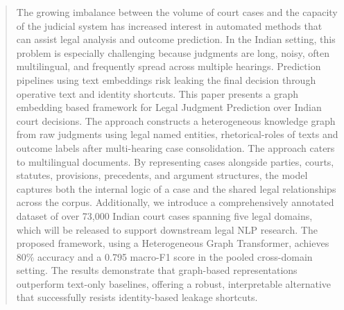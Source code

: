 \begin{abstract}
The growing imbalance between the volume of court cases and the capacity of the judicial system has increased interest in automated methods that can assist legal analysis and outcome prediction. In the Indian setting, this problem is especially challenging because judgments are long, noisy, often multilingual, and frequently spread across multiple hearings.  Prediction pipelines using text embeddings risk leaking the final decision through operative text and identity shortcuts. This paper presents a graph embedding based framework for Legal Judgment Prediction over Indian court decisions. The approach constructs a heterogeneous knowledge graph from raw judgments using legal named entities, rhetorical-roles of texts and outcome labels after multi-hearing case consolidation. The approach caters to multilingual documents. By representing cases alongside parties, courts, statutes, provisions, precedents, and argument structures, the model captures both the internal logic of a case and the shared legal relationships across the corpus. Additionally, we introduce a comprehensively annotated dataset of over 73,000 Indian court cases spanning five legal domains, which will be released to support downstream legal NLP research. The proposed framework, using a Heterogeneous Graph Transformer, achieves 80\% accuracy and a 0.795 macro-F1 score in the pooled cross-domain setting. The results demonstrate that graph-based representations outperform text-only baselines, offering a robust, interpretable alternative that successfully resists identity-based leakage shortcuts.
\end{abstract}
